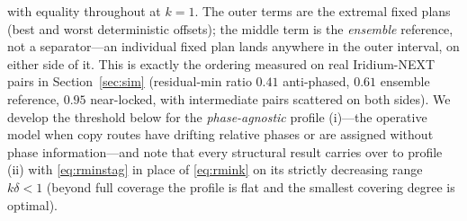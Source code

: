 \documentclass[twocolumn,3p,times,procedia]{elsarticle}
\begin{document}
with equality throughout at $k{=}1$. The outer terms are the extremal
fixed plans (best and worst deterministic offsets); the middle term is
the \emph{ensemble} reference, not a separator---an individual fixed
plan lands anywhere in the outer interval, on either side of it. This
is exactly the ordering
measured on real Iridium-NEXT pairs in Section~\ref{sec:sim}
(residual-min ratio $0.41$ anti-phased, $0.61$ ensemble reference,
$0.95$ near-locked, with intermediate pairs scattered on both sides). We develop the threshold below for the
\emph{phase-agnostic} profile (i)---the operative model when copy
routes have drifting relative phases or are assigned without phase
information---and note that every structural result carries over to
profile (ii) with \eqref{eq:rminstag} in place of \eqref{eq:rmink} on
its strictly decreasing range $k\delta<1$ (beyond full coverage the
profile is flat and the smallest covering degree is optimal).
\end{document}
